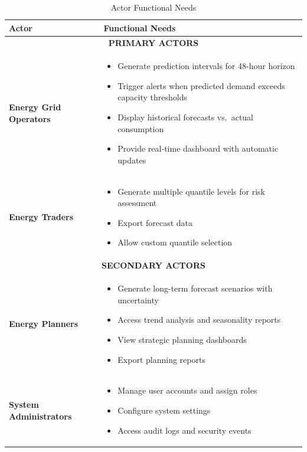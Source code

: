 \begin{table}[H]
\centering
\caption{Actor Functional Needs}
\label{tab:functional_needs}
\begin{tabular}{|p{7cm}|p{9cm}|}
\hline
\textbf{Actor} & \textbf{Functional Needs} \\
\hline
\multicolumn{2}{|c|}{\textbf{PRIMARY ACTORS}} \\
\hline
\textbf{Energy Grid Operators} &
\begin{itemize}[leftmargin=*, nosep, topsep=2pt, partopsep=0pt]
  \item Generate prediction intervals for 48-hour horizon
  \item Trigger alerts when predicted demand exceeds capacity thresholds
  \item Display historical forecasts vs.\ actual consumption
  \item Provide real-time dashboard with automatic updates
\end{itemize} \\
\hline
\textbf{Energy Traders} &
\begin{itemize}[leftmargin=*, nosep, topsep=2pt, partopsep=0pt]
  \item Generate multiple quantile levels for risk assessment
  \item Export forecast data
  \item Allow custom quantile selection
\end{itemize} \\
\hline
\multicolumn{2}{|c|}{\textbf{SECONDARY ACTORS}} \\
\hline
\textbf{Energy Planners} &
\begin{itemize}[leftmargin=*, nosep, topsep=2pt, partopsep=0pt]
  \item Generate long-term forecast scenarios with uncertainty
  \item Access trend analysis and seasonality reports
  \item View strategic planning dashboards
  \item Export planning reports
\end{itemize} \\
\hline
\textbf{System Administrators} &
\begin{itemize}[leftmargin=*, nosep, topsep=2pt, partopsep=0pt]
  \item Manage user accounts and assign roles
  \item Configure system settings
  \item Access audit logs and security events

\end{itemize}
\end{tabular}
\end{table}
